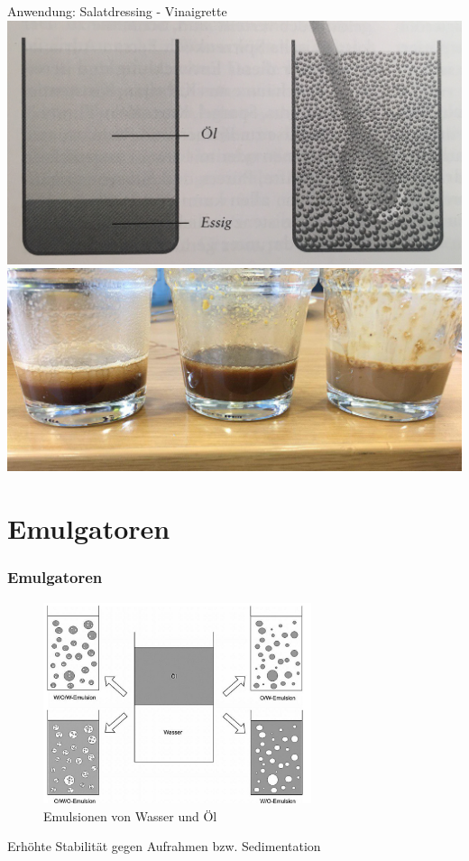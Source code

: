 \documentclass{beamer} %
\begin{document}
\begin{frame}{Anwendung: Salatdressing - Vinaigrette}
	\flushright
	\includegraphics[width=0.6\linewidth]{Markus/Vinaigrette}
	\flushleft
	\includegraphics[width=0.6\linewidth]{Markus/Vinaigrette_test}
\end{frame}



\section{Emulgatoren}
\begin{frame}
\frametitle{Emulgatoren}
\begin{figure}
\centering
\includegraphics[width = 0.7\textwidth]{Emulsionsarten.JPG}
\caption{Emulsionen von Wasser und Öl}
\end{figure}
\begin{block}{}
Erhöhte Stabilität gegen Aufrahmen bzw. Sedimentation
\end{block}
\end{frame}
\end{document}
